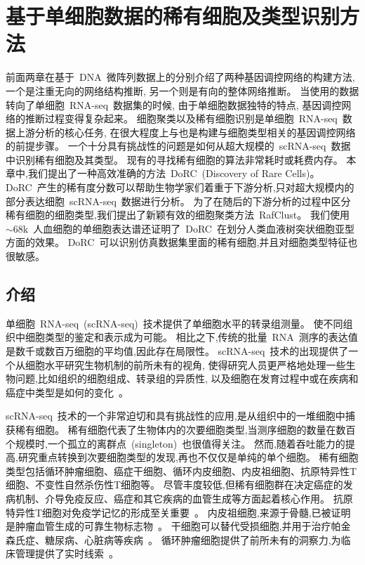 \section{基于单细胞数据的稀有细胞及类型识别方法}
\label{sec:dorc}
前面两章在基于~DNA~微阵列数据上的分别介绍了两种基因调控网络的构建方法,
一个是注重无向的网络结构推断, 另一个则是有向的整体网络推断。
当使用的数据转向了单细胞~RNA-seq~数据集的时候, 由于单细胞数据独特的特点, 基因调控网络的推断过程变得复杂起来。
细胞聚类以及稀有细胞识别是单细胞~RNA-seq~数据上游分析的核心任务, 
在很大程度上与也是构建与细胞类型相关的基因调控网络的前提步骤。
一个十分具有挑战性的问题是如何从超大规模的~scRNA-seq~数据中识别稀有细胞及其类型。
现有的寻找稀有细胞的算法非常耗时或耗费内存。
本章中,我们提出了一种高效准确的方法~DoRC~(Discovery of Rare Cells)。
DoRC~产生的稀有度分数可以帮助生物学家们着重于下游分析,只对超大规模内的部分表达细胞~scRNA-seq~数据进行分析。
为了在随后的下游分析的过程中区分稀有细胞的细胞类型,我们提出了新颖有效的细胞聚类方法~RafClust。
我们使用~${\sim}68$k~人血细胞的单细胞表达谱还证明了~DoRC~在划分人类血液树突状细胞亚型方面的效果。
DoRC~可以识别仿真数据集里面的稀有细胞,并且对细胞类型特征也很敏感。

\subsection{介绍}
单细胞~RNA-seq~(scRNA-seq)~技术提供了单细胞水平的转录组测量。
使不同组织中细胞类型的鉴定和表示成为可能。
相比之下,传统的批量~RNA~测序的表达值是数千或数百万细胞的平均值,因此存在局限性。
scRNA-seq~技术的出现提供了一个从细胞水平研究生物机制的前所未有的视角,
使得研究人员更严格地处理一些生物问题,比如组织的细胞组成、转录组的异质性,
以及细胞在发育过程中或在疾病和癌症中类型是如何的变化~\cite{kumar2017understanding,patel2014single}。

scRNA-seq~技术的一个非常迫切和具有挑战性的应用,是从组织中的一堆细胞中捕获稀有细胞。
稀有细胞代表了生物体内的次要细胞类型,当测序细胞的数量在数百个规模时,一个孤立的离群点~(singleton)~也很值得关注。
然而,随着吞吐能力的提高,研究重点转换到次要细胞类型的发现,再也不仅仅是单纯的单个细胞。
稀有细胞类型包括循环肿瘤细胞、癌症干细胞、循环内皮细胞、内皮祖细胞、抗原特异性T细胞、不变性自然杀伤性T细胞等。
尽管丰度较低,但稀有细胞群在决定癌症的发病机制、介导免疫反应、癌症和其它疾病的血管生成等方面起着核心作用。
抗原特异性T细胞对免疫学记忆的形成至关重要~\cite{slansky2003antigen,altman1996phenotypic,manzo2015antigen}。
内皮祖细胞,来源于骨髓,已被证明是肿瘤血管生成的可靠生物标志物~\cite{kuo2012dynamics,cima2016tumor}。
干细胞可以替代受损细胞,并用于治疗帕金森氏症、糖尿病、心脏病等疾病~\cite{jang2005stem}。
循环肿瘤细胞提供了前所未有的洞察力,为临床管理提供了实时线索~\cite{krebs2010circulating}。

